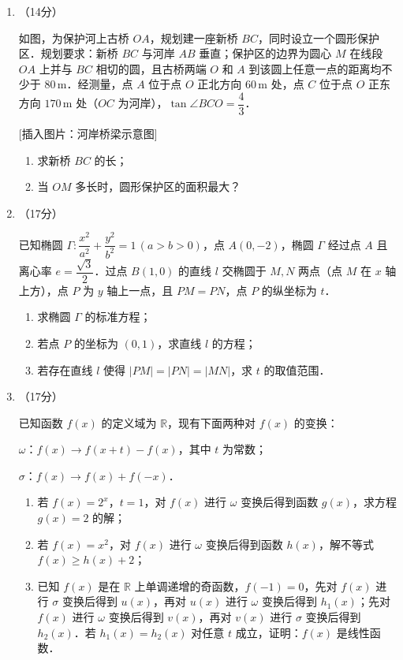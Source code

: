 \begin{description}
\begin{enumerate}[leftmargin=5pt]
        \item （14分）

        如图，为保护河上古桥 $OA$，规划建一座新桥 $BC$，同时设立一个圆形保护区．规划要求：新桥 $BC$ 与河岸 $AB$ 垂直；保护区的边界为圆心 $M$ 在线段 $OA$ 上并与 $BC$ 相切的圆，且古桥两端 $O$ 和 $A$ 到该圆上任意一点的距离均不少于 $80\,\text{m}$．经测量，点 $A$ 位于点 $O$ 正北方向 $60\,\text{m}$ 处，点 $C$ 位于点 $O$ 正东方向 $170\,\text{m}$ 处（$OC$ 为河岸），$\tan\angle BCO=\dfrac{4}{3}$．

        \textsf{[插入图片：河岸桥梁示意图]}

        \begin{enumerate}[label=(\arabic*)]
            \item 求新桥 $BC$ 的长；
            \item 当 $OM$ 多长时，圆形保护区的面积最大？
        \end{enumerate}

        \item （17分）

        已知椭圆 $\Gamma:\dfrac{x^2}{a^2}+\dfrac{y^2}{b^2}=1\,(a>b>0)$，点 $A(0,-2)$，椭圆 $\Gamma$ 经过点 $A$ 且离心率 $e=\dfrac{\sqrt{3}}{2}$．过点 $B(1,0)$ 的直线 $l$ 交椭圆于 $M,N$ 两点（点 $M$ 在 $x$ 轴上方），点 $P$ 为 $y$ 轴上一点，且 $PM=PN$，点 $P$ 的纵坐标为 $t$．

        \begin{enumerate}[label=(\arabic*)]
            \item 求椭圆 $\Gamma$ 的标准方程；
            \item 若点 $P$ 的坐标为 $(0,1)$，求直线 $l$ 的方程；
            \item 若存在直线 $l$ 使得 $|PM|=|PN|=|MN|$，求 $t$ 的取值范围．
        \end{enumerate}

        \item （17分）

        已知函数 $f(x)$ 的定义域为 $\mathbb{R}$，现有下面两种对 $f(x)$ 的变换：

        $\omega$：$f(x)\to f(x+t)-f(x)$，其中 $t$ 为常数；

        $\sigma$：$f(x)\to f(x)+f(-x)$．

        \begin{enumerate}[label=(\arabic*)]
            \item 若 $f(x)=2^x$，$t=1$，对 $f(x)$ 进行 $\omega$ 变换后得到函数 $g(x)$，求方程 $g(x)=2$ 的解；
            \item 若 $f(x)=x^2$，对 $f(x)$ 进行 $\omega$ 变换后得到函数 $h(x)$，解不等式 $f(x)\geqslant h(x)+2$；
            \item 已知 $f(x)$ 是在 $\mathbb{R}$ 上单调递增的奇函数，$f(-1)=0$，先对 $f(x)$ 进行 $\sigma$ 变换后得到 $u(x)$，再对 $u(x)$ 进行 $\omega$ 变换后得到 $h_1(x)$；先对 $f(x)$ 进行 $\omega$ 变换后得到 $v(x)$，再对 $v(x)$ 进行 $\sigma$ 变换后得到 $h_2(x)$．若 $h_1(x)=h_2(x)$ 对任意 $t$ 成立，证明：$f(x)$ 是线性函数．
        \end{enumerate}
    \end{enumerate}
\end{description}
\clearpage


